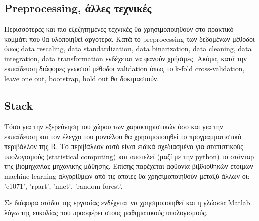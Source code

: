 \subsection{Preprocessing, άλλες τεχνικές}

Περισσότερες και πιο εξεζητημένες τεχνικές θα χρησιμοποιηθούν στο πρακτικό
κομμάτι που θα υλοποιηθεί αργότερα. Κατά το preprocessing των δεδομένων μέθοδοι
όπως data rescaling, data standardization, data binarization, data cleaning,
data integration, data transformation ενδέχεται να φανούν χρήσιμες. Ακόμα, κατά
την εκπαίδευση διάφορες γνωστοί μέθοδοι validation όπως το k-fold cross-validation,
leave one out, bootstrap, hold out θα δοκιμαστούν.

\subsection{Stack}

Τόσο για την εξερεύνηση του χώρου των χαρακτηριστικών όσο και για την εκπαίδευση
και τον έλεγχο του μοντέλου θα χρησιμοποιηθεί το προγραμματιστικό περιβάλλον της
R. Το περιβάλλον αυτό είναι ειδικά σχεδιασμένο για στατιστικούς υπολογισμούς
(statistical computing) και αποτελεί (μαζί με την python) το στάνταρ της
βιομηχανίας μηχανικής μάθησης. Επίσης παρέχεται αφθονία βιβλιοθηκών έτοιμων
machine learning αλγορίθμων από τις οποίες θα χρησιμοποιηθούν μεταξύ άλλων οι:
'e1071', 'rpart', 'nnet', 'random forest'.

Σε διάφορα στάδια της εργασίας ενδέχεται να χρησιμοποιηθεί και η γλώσσα Matlab
λόγω της ευκολίας που προσφέρει στους μαθηματικούς υπολογισμούς.

